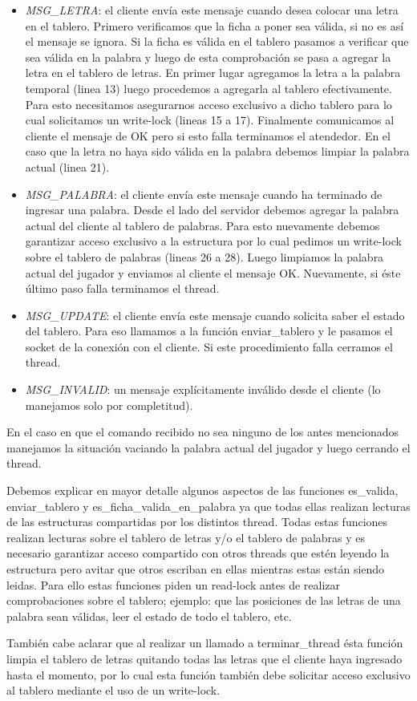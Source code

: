 \documentclass[a4paper,11pt]{article}
\begin{document}
	\begin{itemize}
		\item \emph{MSG\_LETRA}: el cliente envía este mensaje cuando desea colocar una letra en el tablero. Primero verificamos que la ficha a poner sea válida, si no es así el mensaje se ignora. Si la ficha es válida en el tablero pasamos a verificar que sea válida en la palabra y luego de esta comprobación se pasa a agregar la letra en el tablero de letras. En primer lugar agregamos la letra a la palabra temporal (linea 13) luego procedemos a agregarla al tablero efectivamente. Para esto necesitamos asegurarnos acceso exclusivo a dicho tablero para lo cual solicitamos un write-lock (lineas 15 a 17). Finalmente comunicamos al cliente el mensaje de OK pero si esto falla terminamos el atendedor. En el caso que la letra no haya sido válida en la palabra debemos limpiar la palabra actual (linea 21).
		
		\item \emph{MSG\_PALABRA}: el cliente envía este mensaje cuando ha terminado de ingresar una palabra. Desde el lado del servidor debemos agregar la palabra actual del cliente al tablero de palabras. Para esto nuevamente debemos garantizar acceso exclusivo a la estructura por lo cual pedimos un write-lock sobre el tablero de palabras (lineas 26 a 28). Luego limpiamos la palabra actual del jugador y enviamos al cliente el mensaje OK. Nuevamente, si éste último paso falla terminamos el thread.
		
		\item \emph{MSG\_UPDATE}: el cliente envía este mensaje cuando solicita saber el estado del tablero. Para eso llamamos a la función enviar\_tablero y le pasamos el socket de la conexión con el cliente. Si este procedimiento falla cerramos el thread.
		
		\item \emph{MSG\_INVALID}: un mensaje explícitamente inválido desde el cliente (lo manejamos solo por completitud).
	
	\end{itemize}
	
	En el caso en que el comando recibido no sea ninguno de los antes mencionados manejamos la situación vaciando la palabra actual del jugador y luego cerrando el thread.
	
	Debemos explicar en mayor detalle algunos aspectos de las funciones es\_valida, enviar\_tablero y es\_ficha\_valida\_en\_palabra ya que todas ellas realizan lecturas de las estructuras compartidas por los distintos thread.
	Todas estas funciones realizan lecturas sobre el tablero de letras y/o el tablero de palabras y es necesario garantizar acceso compartido con otros threads que estén leyendo la estructura pero avitar que otros escriban en ellas mientras estas están siendo leidas.
	Para ello estas funciones piden un read-lock antes de realizar comprobaciones sobre el tablero; ejemplo: que las posiciones de las letras de una palabra sean válidas, leer el estado de todo el tablero, etc.
	
	También cabe aclarar que al realizar un llamado a terminar\_thread ésta función limpia el tablero de letras quitando todas las letras que el cliente haya ingresado hasta el momento, por lo cual esta función también debe solicitar acceso exclusivo al tablero mediante el uso de un write-lock.
\end{document}
